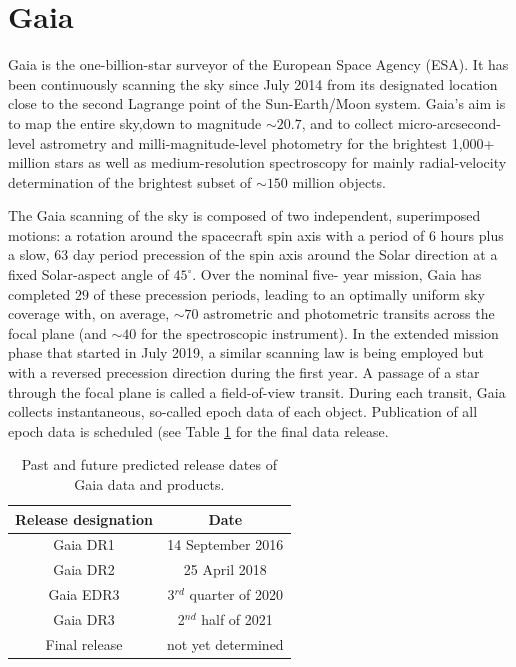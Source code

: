\section{Gaia}
\label{sec:gaia_data}
Gaia is the one-billion-star surveyor of the European Space Agency (ESA). It has been continuously scanning the sky since July 2014 from its designated location close to the second Lagrange point of the Sun-Earth/Moon system. Gaia’s aim is to map the entire sky,down to magnitude $\sim20.7$, and to collect micro-arcsecond-level astrometry and milli-magnitude-level photometry for the brightest 1,000+ million stars as well as medium-resolution spectroscopy for mainly radial-velocity determination of the brightest subset of $\sim150$ million objects. 

The Gaia scanning of the sky is composed of two independent, superimposed motions: a rotation around the spacecraft spin axis with a period of 6 hours plus a slow, 63 day period precession of the spin axis around the Solar direction at a fixed Solar-aspect angle of $45^\circ$. Over the nominal five-
year mission, Gaia has completed $29$ of these precession periods, leading to an optimally uniform sky coverage with, on average, $\sim70$ astrometric and photometric transits across the focal plane (and $\sim40$ for the spectroscopic instrument). In the extended mission phase that started in July 2019, a similar scanning law is being employed but with a reversed precession direction during the first year. A passage of a star through the focal plane is called a field-of-view transit. During each transit, Gaia collects instantaneous, so-called epoch data of each object. Publication of all epoch data is scheduled (see Table \ref{tab:gaia_drs} for the final data release.

\begin{table}
	\centering
	\caption{Past and future predicted release dates of Gaia data and products.}
	\begin{tabular}{c c}
		\hline
		Release designation & Date \\ 
		\hline
		Gaia DR1 & 14 September 2016 \\
		Gaia DR2 & 25 April 2018 \\
		Gaia EDR3 & 3$^{rd}$ quarter of 2020 \\
		Gaia DR3 & 2$^{nd}$ half of 2021 \\
		Final release & not yet determined \\
		\hline
	\end{tabular}
	\label{tab:gaia_drs}
\end{table}

